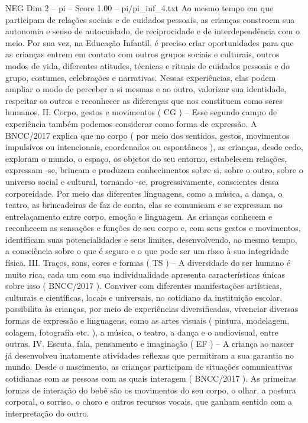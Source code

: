 \begin{textsample}{NEG Dim 2 – pi – Score 1.00 – pi/pi\_inf\_4.txt}
Ao mesmo tempo em que participam de relações sociais e de cuidados pessoais, as crianças constroem sua autonomia e senso de autocuidado, de reciprocidade e de interdependência com o meio.
Por sua vez, na Educação Infantil, é preciso criar oportunidades para que as crianças entrem em contato com outros grupos sociais e culturais, outros modos de vida, diferentes atitudes, técnicas e rituais de cuidados pessoais e do grupo, costumes, celebrações e narrativas.
Nessas experiências, elas podem ampliar o modo de perceber a si mesmas e ao outro, valorizar sua identidade, respeitar os outros e reconhecer as diferenças que nos constituem como seres humanos.
II.
Corpo, gestos e movimentos ( CG ) – Esse segundo campo de experiência também podemos considerar como forma de expressão.
A BNCC/2017 explica que no corpo ( por meio dos sentidos, gestos, movimentos impulsivos ou intencionais, coordenados ou espontâneos ), as crianças, desde cedo, exploram o mundo, o espaço, os objetos do seu entorno, estabelecem relações, expressam -se, brincam e produzem conhecimentos sobre si, sobre o outro, sobre o universo social e cultural, tornando -se, progressivamente, conscientes dessa corporeidade.
Por meio das diferentes linguagens, como a música, a dança, o teatro, as brincadeiras de faz de conta, elas se comunicam e se expressam no entrelaçamento entre corpo, emoção e linguagem.
As crianças conhecem e reconhecem as sensações e funções de seu corpo e, com seus gestos e movimentos, identificam suas potencialidades e seus limites, desenvolvendo, ao mesmo tempo, a consciência sobre o que é seguro e o que pode ser um risco à sua integridade física.
III.
Traços, sons, cores e formas ( TS ) – A diversidade do ser humano é muito rica, cada um com sua individualidade apresenta características únicas sobre isso ( BNCC/2017 ).
Conviver com diferentes manifestações artísticas, culturais e científicas, locais e universais, no cotidiano da instituição escolar, possibilita às crianças, por meio de experiências diversificadas, vivenciar diversas formas de expressão e linguagens, como as artes visuais ( pintura, modelagem, colagem, fotografia etc. ), a música, o teatro, a dança e o audiovisual, entre outras.
IV.
Escuta, fala, pensamento e imaginação ( EF ) – A criança ao nascer já desenvolveu inatamente atividades reflexas que permitiram a sua garantia no mundo.
Desde o nascimento, as crianças participam de situações comunicativas cotidianas com as pessoas com as quais interagem ( BNCC/2017 ).
As primeiras formas de interação do bebê são os movimentos do seu corpo, o olhar, a postura corporal, o sorriso, o choro e outros recursos vocais, que ganham sentido com a interpretação do outro.

\end{textsample}
